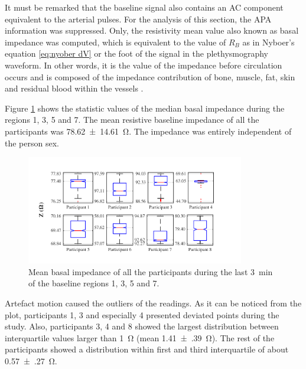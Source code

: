 It must be remarked that the baseline signal also contains an AC component equivalent to the arterial pulses. For the analysis of this section, the APA information was suppressed. Only, the resistivity mean value also known as basal impedance was computed, which is equivalent to the value of $R_B$ as in Nyboer's equation \ref{eq:nyober dV} or the foot of the signal in the plethysmography waveform. In other words, it is the value of the impedance before circulation occurs and is composed of the impedance contribution of bone, muscle, fat, skin and residual blood within the vessels \cite{dai2009vivo}. 

Figure \ref{fig:Basal statistics} shows the statistic values of the median basal impedance during the regions 1, 3, 5 and 7. The mean resistive baseline impedance of all the participants was \SI{78.62(1461)}{\ohm}. The impedance was entirely independent of the person sex.  

\begin{figure}[!htbp]
	\centering
	\includegraphics[width=0.85\textwidth,keepaspectratio]{figure_b_1}    
	\caption[Mean basal impedance boxplot]{Mean basal impedance of all the participants during the last \SI{3}{\minute} of the baseline regions 1, 3, 5 and 7.}
	\label{fig:Basal statistics} 
\end{figure}

Artefact motion caused the outliers of the readings. As it can be noticed from the plot, participants 1, 3 and especially 4 presented deviated points during the study. Also, participants 3, 4 and 8 showed the largest distribution between interquartile values larger than \SI{1}{\ohm} (mean \SI{1.41(39)}{\ohm}). The rest of the participants showed a distribution within first and third interquartile of about \SI{0.57(27)}{\ohm}. 


